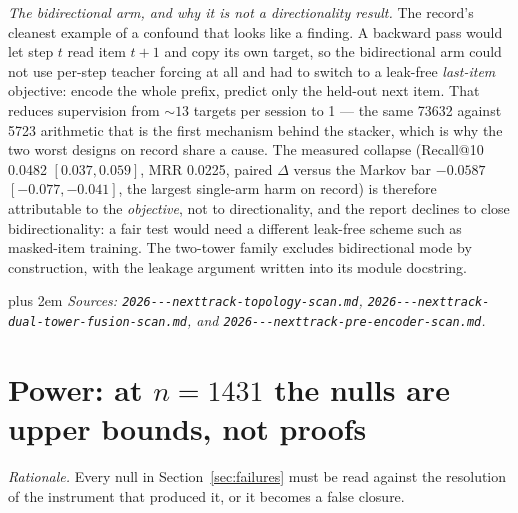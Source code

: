 \documentclass[11pt]{article}
\begin{document}
\emph{The bidirectional arm, and why it is not a directionality result.} The
record's cleanest example of a confound that looks like a finding. A backward
pass would let step $t$ read item $t+1$ and copy its own target, so the
bidirectional arm could not use per-step teacher forcing at all and had to switch
to a leak-free \emph{last-item} objective: encode the whole prefix, predict only
the held-out next item. That reduces supervision from ${\sim}13$ targets per
session to \num{1} --- the same \num{73632} against \num{5723} arithmetic that is
the first mechanism behind the stacker, which is why the two worst designs on
record share a cause. The measured collapse (Recall@10 \num{0.0482}
$[\num{0.037},\num{0.059}]$, MRR \num{0.0225}, paired $\Delta$ versus the Markov
bar $-\num{0.0587}$ $[-\num{0.077},-\num{0.041}]$, the largest single-arm harm on
record) is therefore attributable to the \emph{objective}, not to
directionality, and the report declines to close bidirectionality: a fair test
would need a different leak-free scheme such as masked-item training. The
two-tower family excludes bidirectional mode by construction, with the leakage
argument written into its module docstring.

{\rightskip=0pt plus 2em \emph{Sources: \texttt{2026---\allowbreak nexttrack-\allowbreak topology-\allowbreak scan.md},
\texttt{2026---\allowbreak nexttrack-\allowbreak dual-\allowbreak tower-\allowbreak fusion-\allowbreak scan.md},
and \texttt{2026---\allowbreak nexttrack-\allowbreak pre-\allowbreak encoder-\allowbreak scan.md}.}\par}

\clearpage
\section{Power: at $n=\num{1431}$ the nulls are upper bounds, not proofs}
\label{sec:power}

\emph{Rationale.} Every null in Section~\ref{sec:failures} must be read against
the resolution of the instrument that produced it, or it becomes a false closure.
\end{document}
